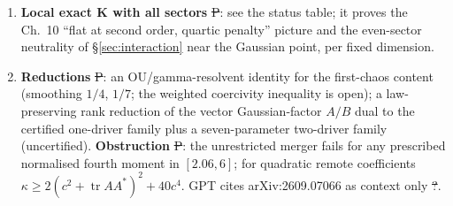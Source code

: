 \documentclass[11pt,a4paper]{article}
\begin{document}
\begin{enumerate}
outside are the phase-zero part, every shared visible sector ($A$, $B$, $Y$, $W$, $\nu$) at finite amplitude, and correlated buffers without $\E[S\mid\mathcal F]=0$.
\item \textbf{Local exact K with all sectors} \st{P}: see the status table; it proves the Ch.~10 ``flat at second order, quartic penalty'' picture and the even-sector neutrality of
\S\ref{sec:interaction} near the Gaussian point, per fixed dimension.
\item \textbf{Reductions} \st{P}: an OU/gamma-resolvent identity for the first-chaos content (smoothing $1/4$, $1/7$; the weighted coercivity inequality is open); a law-preserving rank reduction of
the vector Gaussian-factor $A/B$ dual to the certified one-driver family plus a seven-parameter two-driver family (uncertified). \textbf{Obstruction} \st{P}: the unrestricted merger fails for
any prescribed normalised fourth moment in $[2.06,6]$; for quadratic remote coefficients $\kappa\ge2(c^2+\operatorname{tr}AA^*)^2+40c^4$. GPT cites arXiv:2609.07066 as context only \st{?}.
\end{enumerate}
\end{document}
